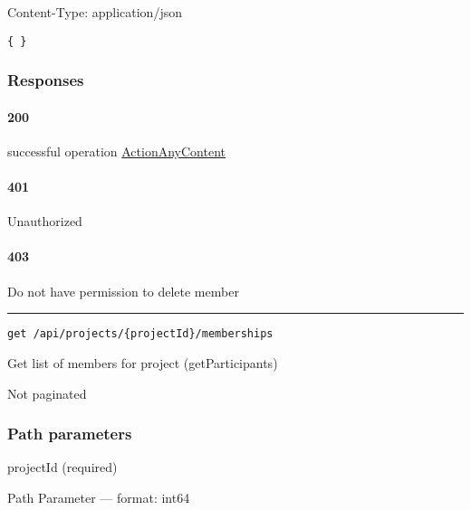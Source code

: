 Content-Type: application/json

\begin{verbatim}
{ }
\end{verbatim}

\hypertarget{responses-5}{%
\subsubsection*{Responses}\label{responses-5}}

\hypertarget{section-17}{%
\paragraph{200}\label{section-17}}

successful operation
\protect\hyperlink{ActionAnyContent}{ActionAnyContent}

\hypertarget{section-18}{%
\paragraph{401}\label{section-18}}

Unauthorized \protect\hyperlink{}{}

\hypertarget{section-19}{%
\paragraph{403}\label{section-19}}

Do not have permission to delete member \protect\hyperlink{}{}

\begin{center}\rule{0.5\linewidth}{0.5pt}\end{center}

\protect\hypertarget{getParticipants}{}{}



\begin{verbatim}
get /api/projects/{projectId}/memberships
\end{verbatim}

Get list of members for project ({getParticipants})

Not paginated

\hypertarget{path-parameters-4}{%
\subsubsection*{Path parameters}\label{path-parameters-4}}

projectId (required)

{Path Parameter} --- format: int64

